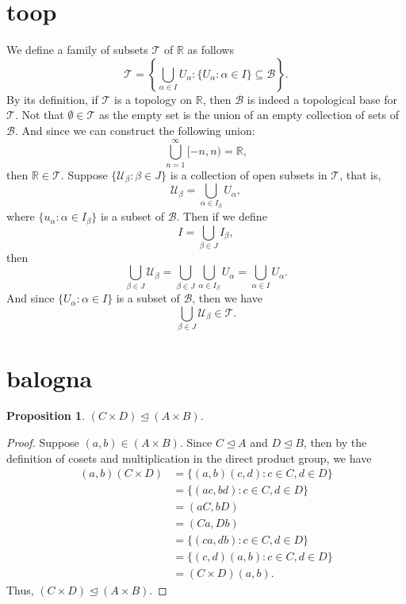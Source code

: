 \documentclass[12pt]{article}
\newtheorem{proposition}{Proposition}
\newcommand{\R}{\mathbb{R}}
\newcommand{\B}{\mathcal{B}}
\newcommand{\T}{\mathscr{T}}
\let\teq\trianglelefteq
\begin{document}
\section{toop}

We define a family of subsets $\T$ of $\R$ as follows
    \[\T = \left\{\bigcup_{\alpha\in I}U_\alpha : \{U_\alpha : \alpha\in I\} \subseteq \B\right\}.\]
    By its definition, if $\T$ is a topology on $\R$, then $\B$ is indeed a topological base for $\T$. Not that $\emptyset \in \T$ as the empty set is the union of an empty collection of sets of $\B$. And since we can construct the following union:
    \[\bigcup_{n=1}^\infty[-n,n) = \R,\]
    then $\R\in\T$. Suppose $\{\mathcal{U}_\beta: \beta\in J\}$ is a collection of open subsets in $\T$, that is,
    \[\mathcal{U}_\beta = \bigcup_{\alpha\in I_\beta}U_\alpha,\]
    where $\{u_\alpha : \alpha\in I_\beta\}$ is a subset of $\B$. Then if we define
    \[I = \bigcup_{\beta \in J}I_\beta,\]
    then
    \[\bigcup_{\beta \in J}\mathcal{U}_\beta = \bigcup_{\beta \in J}\bigcup_{\alpha\in I_\beta}U_\alpha = \bigcup_{\alpha\in I}U_\alpha.\]
    And since $\{U_\alpha : \alpha \in I\}$ is a subset of $\B$, then we have
    \[\bigcup_{\beta \in J}\mathcal{U}_\beta \in \T.\]


\section{balogna}

\begin{proposition}
    $(C\times D)\teq(A\times B)$.
\end{proposition}

\begin{proof}
    Suppose $(a,b)\in (A\times B)$. Since $C\teq A$ and $D\teq B$, then by the definition of cosets and multiplication in the direct product group, we have
    \begin{align*}
        (a,b)(C\times D) 
            &= \{(a,b)(c,d) : c\in C, d\in D\} \\
            &= \{(ac,bd) : c\in C, d\in D\} \\
            &= (aC, bD) \\
            &= (Ca, Db) \\
            &= \{(ca,db) : c\in C, d\in D\} \\
            &= \{(c,d)(a,b) : c\in C, d\in D\} \\
            &= (C\times D)(a,b).
    \end{align*}
    Thus, $(C\times D)\teq(A\times B)$.

\end{proof}
\end{document}
